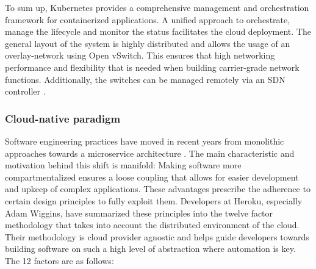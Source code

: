 To sum up, Kubernetes provides a comprehensive management and orchestration framework for containerized applications. A unified approach to orchestrate, manage the lifecycle and monitor the status facilitates the cloud deployment. The general layout of the system is highly distributed and allows the usage of an overlay-network using Open vSwitch. This ensures that high networking performance and flexibility that is needed when building carrier-grade network functions. Additionally, the switches can be managed remotely via an SDN controller \cite{k8CN} \cite{burns2016borg} \cite{kubernetesUp}.

\subsubsection{Cloud-native paradigm}
Software engineering practices have moved in recent years from monolithic approaches towards a microservice architecture \cite{chowdhury2019re}. The main characteristic and motivation behind this shift is manifold: Making software more compartmentalized ensures a loose coupling that allows for easier development and upkeep of complex applications. These advantages prescribe the adherence to certain design principles to fully exploit them. 
Developers at Heroku, especially Adam Wiggins, have summarized these principles into the twelve factor methodology that takes into account the distributed environment of the cloud. Their methodology is cloud provider agnostic and helps guide developers towards building software on such a high level of abstraction where automation is key. The 12 factors are as follows:

